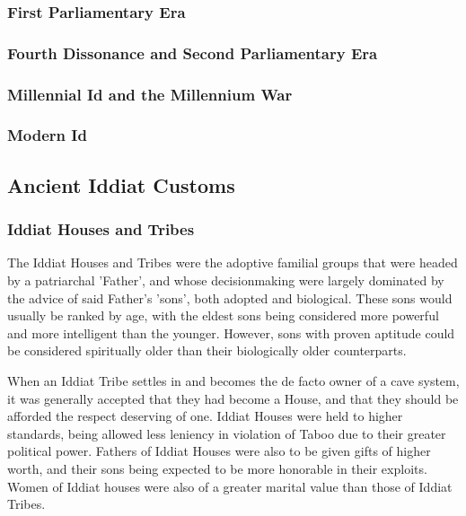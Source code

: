 			\subsubsection{First Parliamentary Era}\par
			
			\subsubsection{Fourth Dissonance and Second Parliamentary Era}\par
			
			\subsubsection{Millennial Id and the Millennium War}\par
			
			\subsubsection{Modern Id}\par
			
			\subsection{Ancient Iddiat Customs}\par
			\subsubsection{Iddiat Houses and Tribes}\par
			The Iddiat Houses and Tribes were the adoptive familial groups that were headed by a patriarchal 'Father', and whose decisionmaking were largely dominated by the advice of said Father's 'sons', both adopted and biological. These sons would usually be ranked by age, with the eldest sons being considered more powerful and more intelligent than the younger. However, sons with proven aptitude could be considered spiritually older than their biologically older counterparts.\par 
			
			When an Iddiat Tribe settles in and becomes the de facto owner of a cave system, it was generally accepted that they had become a House, and that they should be afforded the respect deserving of one. Iddiat Houses were held to higher standards, being allowed less leniency in violation of Taboo due to their greater political power. Fathers of Iddiat Houses were also to be given gifts of higher worth, and their sons being expected to be more honorable in their exploits. Women of Iddiat houses were also of a greater marital value than those of Iddiat Tribes.\par 
			
